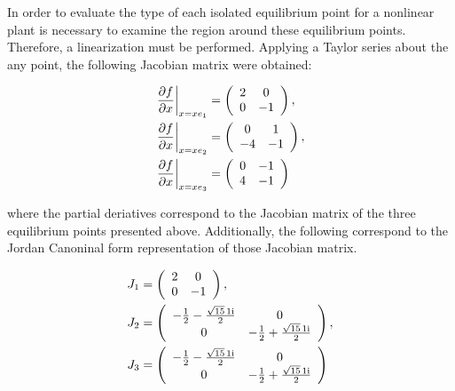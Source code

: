 \documentclass[a4paper,10pt]{article}
\begin{document}
In order to evaluate the type of each isolated equilibrium point for a nonlinear plant is necessary to examine the region around these equilibrium points. Therefore, a linearization must be performed. Applying a Taylor series about the any point, the following Jacobian matrix were obtained:

\begin{eqnarray*}
\centering
\left.\frac{\partial f}{\partial x}\right\vert_{x=xe_1}^{} &= \left(\begin{array}{cc} 2 & 0\\ 0 & -1 \end{array}\right),  \\
\left.\frac{\partial f}{\partial x}\right\vert_{x=xe_2}^{} &= \left(\begin{array}{cc} 0 & 1\\ -4 & -1 \end{array}\right),\\
\left.\frac{\partial f}{\partial x}\right\vert_{x=xe_3}^{} &= \left(\begin{array}{cc} 0 & -1\\ 4 & -1 \end{array}\right)
 \end{eqnarray*}

where the partial deriatives correspond to the Jacobian matrix of the three equilibrium points presented above. Additionally, the following correspond to the Jordan Canoninal form representation of those Jacobian matrix.

\begin{eqnarray*}
\centering
J_1 &= \left(\begin{array}{cc} 2 & 0\\ 0 & -1 \end{array}\right), \\
J_2 &= \left(\begin{array}{cc} -\frac{1}{2}-\frac{\sqrt{15}\,1{}\mathrm{i}}{2} & 0\\ 0 & -\frac{1}{2}+\frac{\sqrt{15}\,1{}\mathrm{i}}{2} \end{array}\right), \\
J_3 &= \left(\begin{array}{cc} -\frac{1}{2}-\frac{\sqrt{15}\,1{}\mathrm{i}}{2} & 0\\ 0 & -\frac{1}{2}+\frac{\sqrt{15}\,1{}\mathrm{i}}{2} \end{array}\right) \\
\end{eqnarray*}
\end{document}
